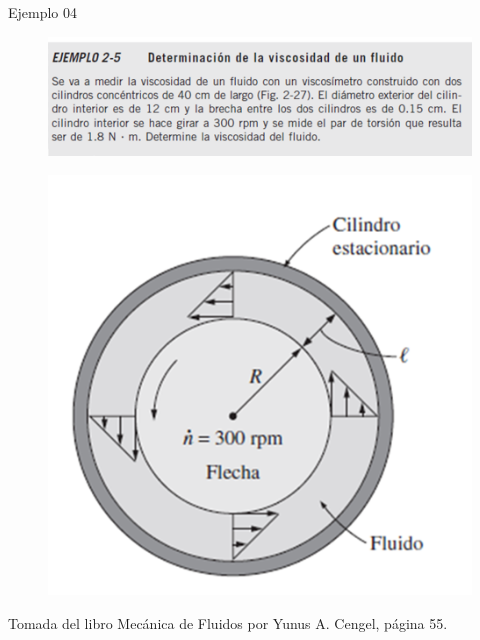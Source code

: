 \begin{frame}{Ejemplo 04}
\justifying
\begin{figure}[H]
\centering
\includegraphics[scale=0.3]{Section_Files/picmanuel/27.png}
\label{fig: Figura2-25}
\end{figure}
\begin{figure}[H]
\centering
\includegraphics[scale=0.4]{Section_Files/picmanuel/28.png}
\label{fig: Figura2-26}
\end{figure}
{\tiny Tomada del libro Mecánica de Fluidos por Yunus A. Cengel, página 55.}
\end{frame}

